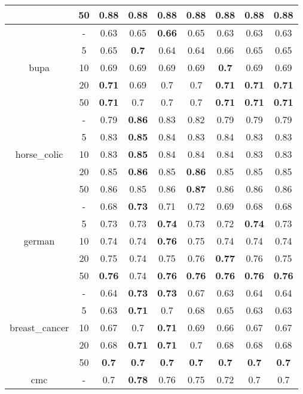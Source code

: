 \documentclass{article}%
\begin{document}
\begin{tabular}{c|c|ccccccc}
&50&\textbf{0.88}&\textbf{0.88}&\textbf{0.88}&\textbf{0.88}&\textbf{0.88}&\textbf{0.88}&\textbf{0.88}\\%
\hline%
\multirow{5}{*}{bupa}&{-}&0.63&0.65&\textbf{0.66}&0.65&0.63&0.63&0.63\\%
\cline{2%
-%
9}%
&5&0.65&\textbf{0.7}&0.64&0.64&0.66&0.65&0.65\\%
\cline{2%
-%
9}%
&10&0.69&0.69&0.69&0.69&\textbf{0.7}&0.69&0.69\\%
\cline{2%
-%
9}%
&20&\textbf{0.71}&0.69&0.7&0.7&\textbf{0.71}&\textbf{0.71}&\textbf{0.71}\\%
\cline{2%
-%
9}%
&50&\textbf{0.71}&0.7&0.7&0.7&\textbf{0.71}&\textbf{0.71}&\textbf{0.71}\\%
\hline%
\multirow{5}{*}{horse\_colic}&{-}&0.79&\textbf{0.86}&0.83&0.82&0.79&0.79&0.79\\%
\cline{2%
-%
9}%
&5&0.83&\textbf{0.85}&0.84&0.83&0.84&0.83&0.83\\%
\cline{2%
-%
9}%
&10&0.83&\textbf{0.85}&0.84&0.84&0.84&0.83&0.83\\%
\cline{2%
-%
9}%
&20&0.85&\textbf{0.86}&0.85&\textbf{0.86}&0.85&0.85&0.85\\%
\cline{2%
-%
9}%
&50&0.86&0.85&0.86&\textbf{0.87}&0.86&0.86&0.86\\%
\hline%
\multirow{5}{*}{german}&{-}&0.68&\textbf{0.73}&0.71&0.72&0.69&0.68&0.68\\%
\cline{2%
-%
9}%
&5&0.73&0.73&\textbf{0.74}&0.73&0.72&\textbf{0.74}&0.73\\%
\cline{2%
-%
9}%
&10&0.74&0.74&\textbf{0.76}&0.75&0.74&0.74&0.74\\%
\cline{2%
-%
9}%
&20&0.75&0.74&0.75&0.76&\textbf{0.77}&0.76&0.75\\%
\cline{2%
-%
9}%
&50&\textbf{0.76}&0.74&\textbf{0.76}&\textbf{0.76}&\textbf{0.76}&\textbf{0.76}&\textbf{0.76}\\%
\hline%
\multirow{5}{*}{breast\_cancer}&{-}&0.64&\textbf{0.73}&\textbf{0.73}&0.67&0.63&0.64&0.64\\%
\cline{2%
-%
9}%
&5&0.63&\textbf{0.71}&0.7&0.68&0.65&0.63&0.63\\%
\cline{2%
-%
9}%
&10&0.67&0.7&\textbf{0.71}&0.69&0.66&0.67&0.67\\%
\cline{2%
-%
9}%
&20&0.68&\textbf{0.71}&\textbf{0.71}&0.7&0.68&0.68&0.68\\%
\cline{2%
-%
9}%
&50&\textbf{0.7}&\textbf{0.7}&\textbf{0.7}&\textbf{0.7}&\textbf{0.7}&\textbf{0.7}&\textbf{0.7}\\%
\hline%
\multirow{5}{*}{cmc}&{-}&0.7&\textbf{0.78}&0.76&0.75&0.72&0.7&0.7\\%

\end{tabular}
\end{document}
